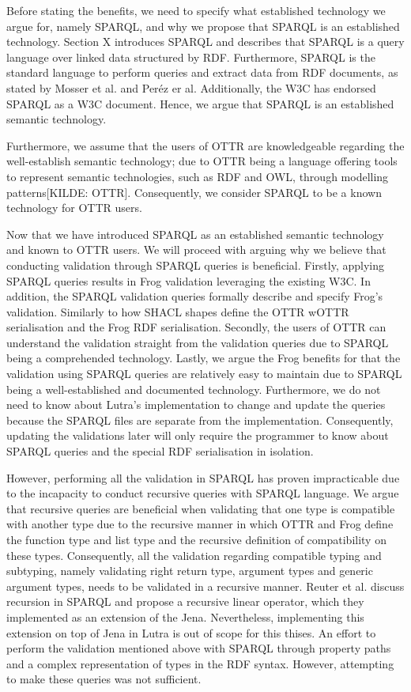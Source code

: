 \para
Before stating the benefits, we need to specify what established technology we argue for, namely SPARQL, and why we propose that SPARQL is an established technology. Section X introduces SPARQL and describes that SPARQL is a query language over linked data structured by RDF. Furthermore, SPARQL is the standard language to perform queries and extract data from RDF documents, as stated by Mosser et al.\cite[1]{MosserSPARQL} and Peréz er al\cite[1]{PerezSPARQL}. Additionally, the W3C has endorsed SPARQL as a W3C document. Hence, we argue that SPARQL is an established semantic technology. 

\para
Furthermore, we assume that the users of OTTR are knowledgeable regarding the well-establish semantic technology; due to OTTR being a language offering tools to represent semantic technologies, such as RDF and OWL, through modelling patterns[KILDE: OTTR]. Consequently, we consider SPARQL to be a known technology for OTTR users. 

\para
Now that we have introduced SPARQL as an established semantic technology and known to OTTR users. We will proceed with arguing why we believe that conducting validation through SPARQL queries is beneficial. Firstly, applying SPARQL queries results in Frog validation leveraging the existing W3C. In addition, the SPARQL validation queries formally describe and specify Frog's validation. Similarly to how SHACL shapes define the OTTR wOTTR serialisation and the Frog RDF serialisation. Secondly, the users of OTTR can understand the validation straight from the validation queries due to SPARQL being a comprehended technology. Lastly, we argue the Frog benefits for that the validation using SPARQL queries are relatively easy to maintain due to SPARQL being a well-established and documented technology. Furthermore, we do not need to know about Lutra's implementation to change and update the queries because the SPARQL files are separate from the implementation. Consequently, updating the validations later will only require the programmer to know about SPARQL queries and the special RDF serialisation in isolation.

\para
However, performing all the validation in SPARQL has proven impracticable due to the incapacity to conduct recursive queries with SPARQL language\cite[711]{RecursionSPARQL}. We argue that recursive queries are beneficial when validating that one type is compatible with another type due to the recursive manner in which OTTR and Frog define the function type and list type and the recursive definition of compatibility on these types. Consequently, all the validation regarding compatible typing and subtyping, namely validating right return type, argument types and generic argument types, needs to be validated in a recursive manner. Reuter et al. discuss recursion in SPARQL and propose a recursive linear operator, which they implemented as an extension of the Jena\cite[732]{RecursionSPARQL}. Nevertheless, implementing this extension on top of Jena in Lutra is out of scope for this thises. An effort to perform the validation mentioned above with SPARQL through property paths and a complex representation of types in the RDF syntax. However, attempting to make these queries was not sufficient. 


